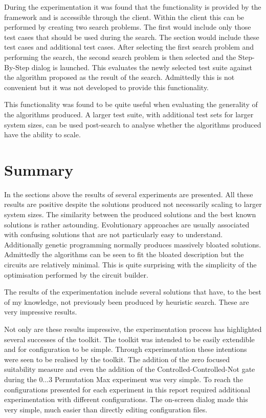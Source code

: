 During the experimentation it was found that the functionality is provided by the framework and is accessible through the client.
Within the client this can be performed by creating two search problems.
The first would include only those test cases that should be used during the search.
The section would include these test cases and additional test cases.
After selecting the first search problem and performing the search, the second search problem is then selected and the Step-By-Step dialog is launched.
This evaluates the newly selected test suite against the algorithm proposed as the result of the search.
Admittedly this is not convenient but it was not developed to provide this functionality.

This functionality was found to be quite useful when evaluating the generality of the algorithms produced.
A larger test suite, with additional test sets for larger system sizes, can be used post-search to analyse whether the algorithms produced have the ability to scale.

\section{Summary}

In the sections above the results of several experiments are presented.
All these results are positive despite the solutions produced not necessarily scaling to larger system sizes.
The similarity between the produced solutions and the best known solutions is rather astounding.
Evolutionary approaches are usually associated with confusing solutions that are not particularly easy to understand.
Additionally genetic programming normally produces massively bloated solutions.
Admittedly the algorithms can be seen to fit the bloated description but the circuits are relatively minimal.
This is quite surprising with the simplicity of the optimisation performed by the circuit builder.

The results of the experimentation include several solutions that have, to the best of my knowledge, not previously been produced by heuristic search.
These are very impressive results.

Not only are these results impressive, the experimentation process has highlighted several successes of the toolkit.
The toolkit was intended to be easily extendible and for configuration to be simple.
Through experimentation these intentions were seen to be realised by the toolkit.
The addition of the zero focused suitability measure and even the addition of the Controlled-Controlled-Not gate during the $0\dots{3}$ Permutation Max experiment was very simple.
To reach the configurations presented for each experiment in this report required additional experimentation with different configurations.
The on-screen dialog made this very simple, much easier than directly editing configuration files.







